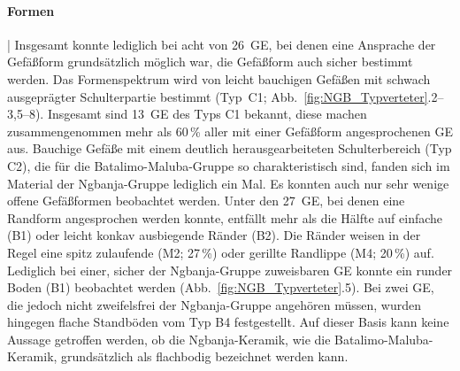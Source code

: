 \paragraph{Formen}\hspace{-.5em}|\hspace{.5em}%
Insgesamt konnte lediglich bei acht von 26~GE, bei denen eine Ansprache der Gefäßform grundsätzlich möglich war, die Gefäßform auch sicher bestimmt werden. Das Formenspektrum wird von leicht bauchigen Gefäßen mit schwach ausgeprägter Schulterpartie bestimmt (Typ~C1; Abb.~\ref{fig:NGB_Typverteter}.2--3,5--8). Insgesamt sind 13~GE des Typs C1 bekannt, diese machen zusammengenommen mehr als 60\,\% aller mit einer Gefäßform angesprochenen GE aus. Bauchige Gefäße mit einem deutlich herausgearbeiteten Schulterbereich (Typ C2), die für die Batalimo-Maluba-Gruppe so charakteristisch sind, fanden sich im Material der \mbox{Ngbanja}-Gruppe lediglich ein Mal. Es konnten auch nur sehr wenige offene Gefäßformen beobachtet werden. Unter den 27~GE, bei denen eine Randform angesprochen werden konnte, entfällt mehr als die Hälfte auf einfache (B1) oder leicht konkav ausbiegende Ränder (B2). Die Ränder weisen in der Regel eine spitz zulaufende (M2; 27\,\%) oder gerillte Randlippe (M4; 20\,\%) auf. Lediglich bei einer, sicher der \mbox{Ngbanja}-Gruppe zuweisbaren GE konnte ein runder Boden (B1) beobachtet werden (Abb.~\ref{fig:NGB_Typverteter}.5). Bei zwei GE, die jedoch nicht zweifelsfrei der \mbox{Ngbanja}-Gruppe angehören müssen, wurden hingegen flache Standböden vom Typ B4 festgestellt. Auf dieser Basis kann keine Aussage getroffen werden, ob die \mbox{Ngbanja}-Keramik, wie die Batalimo-Maluba-Keramik, grundsätzlich als flachbodig bezeichnet werden kann.


